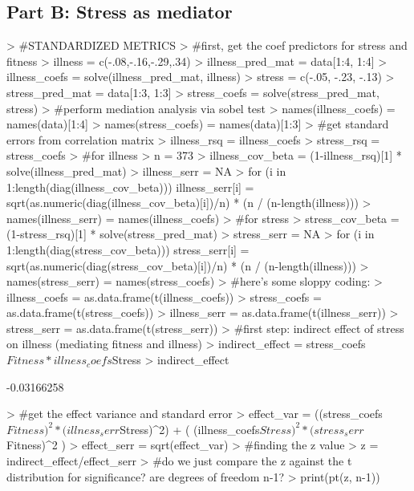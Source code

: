 \documentclass{article}
\begin{document}
\subsection{Part B: Stress as mediator}

\begin{Schunk}
\begin{Sinput}
> #STANDARDIZED METRICS
> #first, get the coef predictors for stress and fitness
> illness = c(-.08,-.16,-.29,.34)
> illness_pred_mat = data[1:4, 1:4]
> illness_coefs = solve(illness_pred_mat, illness)
> stress = c(-.05, -.23, -.13)
> stress_pred_mat = data[1:3, 1:3]
> stress_coefs = solve(stress_pred_mat, stress)
> #perform mediation analysis via sobel test
> names(illness_coefs) = names(data)[1:4] 
> names(stress_coefs) = names(data)[1:3]
> #get standard errors from correlation matrix
> illness_rsq = illness_coefs %
> stress_rsq = stress_coefs %
> #for illness
> n = 373
> illness_cov_beta = (1-illness_rsq)[1] * solve(illness_pred_mat)
> illness_serr = NA
> for (i in 1:length(diag(illness_cov_beta))){
 	illness_serr[i] = sqrt(as.numeric(diag(illness_cov_beta)[i])/n) * (n / (n-length(illness))) 
 }
> names(illness_serr) = names(illness_coefs)
> #for stress
> stress_cov_beta = (1-stress_rsq)[1] * solve(stress_pred_mat)
> stress_serr = NA
> for (i in 1:length(diag(stress_cov_beta))){
 	stress_serr[i] = sqrt(as.numeric(diag(stress_cov_beta)[i])/n) * (n / (n-length(illness)))
 }
> names(stress_serr) = names(stress_coefs)
> #here's some sloppy coding:
> illness_coefs = as.data.frame(t(illness_coefs))
> stress_coefs = as.data.frame(t(stress_coefs))
> illness_serr = as.data.frame(t(illness_serr))
> stress_serr = as.data.frame(t(stress_serr))
> #first step: indirect effect of stress on illness (mediating fitness and illness)
> indirect_effect = stress_coefs$Fitness * illness_coefs$Stress
> indirect_effect
\end{Sinput}
\begin{Soutput}
[1] -0.03166258
\end{Soutput}
\begin{Sinput}
> #get the effect variance and standard error
> effect_var = ((stress_coefs$Fitness)^2 * (illness_serr$Stress)^2) + 
   ( (illness_coefs$Stress)^2 * (stress_serr$Fitness)^2 )
> effect_serr = sqrt(effect_var)
> #finding the z value
> z = indirect_effect/effect_serr
> #do we just compare the z against the t distribution for significance?  are degrees of freedom n-1?
> print(pt(z, n-1))
\end{Sinput}
\begin{Soutput}

\end{Soutput}
\end{Schunk}
\end{document}
